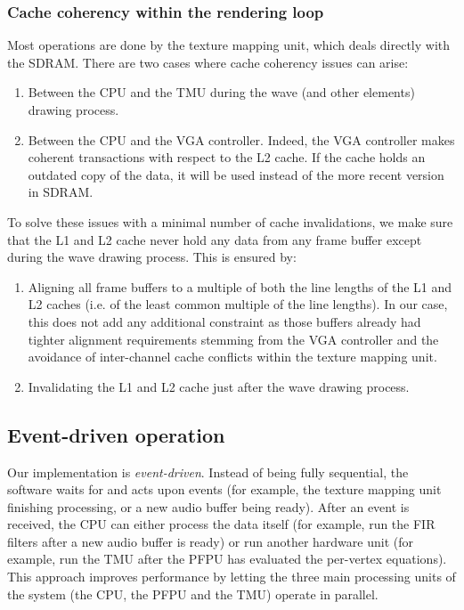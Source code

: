 \documentclass[a4paper,11pt]{kthesis}
\begin{document}
\subsubsection{Cache coherency within the rendering loop}
Most operations are done by the texture mapping unit, which deals directly with the SDRAM. There are two cases where cache coherency issues can arise:
\begin{enumerate}
\item Between the CPU and the TMU during the wave (and other elements) drawing process.
\item Between the CPU and the VGA controller. Indeed, the VGA controller makes coherent transactions with respect to the L2 cache. If the cache holds an outdated copy of the data, it will be used instead of the more recent version in SDRAM.
\end{enumerate}

To solve these issues with a minimal number of cache invalidations, we make sure that the L1 and L2 cache never hold any data from any frame buffer except during the wave drawing process. This is ensured by:
\begin{enumerate}
\item Aligning all frame buffers to a multiple of both the line lengths of the L1 and L2 caches (i.e. of the least common multiple of the line lengths). In our case, this does not add any additional constraint as those buffers already had tighter alignment requirements stemming from the VGA controller and the avoidance of inter-channel cache conflicts within the texture mapping unit.
\item Invalidating the L1 and L2 cache just after the wave drawing process.
\end{enumerate}

\subsection{Event-driven operation}
Our implementation is \textit{event-driven}. Instead of being fully sequential, the software waits for and acts upon events (for example, the texture mapping unit finishing processing, or a new audio buffer being ready). After an event is received, the CPU can either process the data itself (for example, run the FIR filters after a new audio buffer is ready) or run another hardware unit (for example, run the TMU after the PFPU has evaluated the per-vertex equations). This approach improves performance by letting the three main processing units of the system (the CPU, the PFPU and the TMU) operate in parallel.
\end{document}
